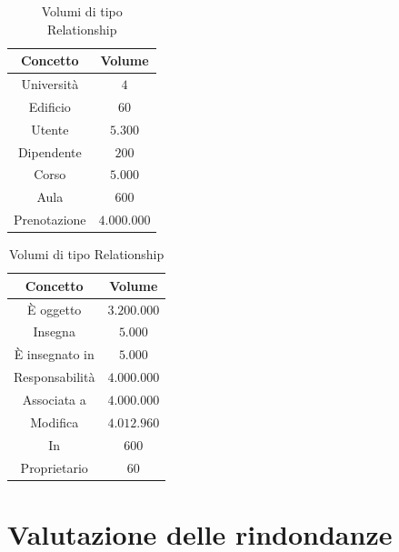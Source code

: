 \documentclass[a4paper, 10pt, oneside]{article} %
\begin{document}
\begin{table}[h]
\centering
\begin{minipage}{.5\linewidth}
  \centering
  \begin{tabular}{c|c}
  \textbf{Concetto}   & \textbf{Volume} \\
\hline   
     Università & $4$\\
     Edificio & $60$\\
     Utente & $5.300$\\
     Dipendente & $200$\\
     Corso & $5.000$\\
     Aula & $600$\\
     Prenotazione & $ 4.000.000 $\\
\end{tabular}
\caption{Volumi di tipo Entity}


\end{minipage}%
\begin{minipage}{.5\linewidth}
  \centering
  \begin{tabular}{c|c}
  \textbf{Concetto}   & \textbf{Volume} \\
\hline   
    È oggetto & $3.200.000$\\
    Insegna & $5.000$\\
    È insegnato in & $5.000$\\
    Responsabilità & $4.000.000$\\
    Associata a & $4.000.000$\\
    Modifica & $4.012.960$\\
    In & $600$\\
    Proprietario & $60$\\
\end{tabular}
\caption{Volumi di tipo Relationship}
\end{minipage}
\end{table}


\section{Valutazione delle rindondanze}
\end{document}
